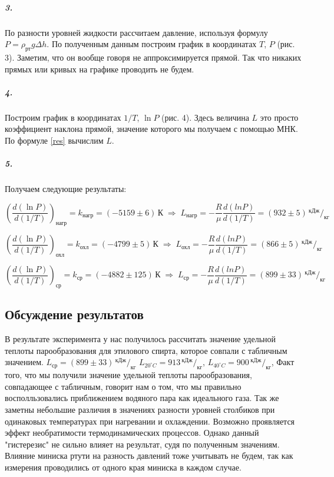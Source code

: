\documentclass[a4paper, 12pt]{article}
\begin{document}
\subparagraph*{3.}  По разности уровней жидкости рассчитаем давление, используя формулу $P = \rho_{рт} g \Delta h$. По полученным данным построим график в координатах $T$,  $P$ (рис. 3). Заметим, что он вообще говоря не аппроксимируется прямой. Так что никаких прямых или кривых на графике проводить не будем. 

\subparagraph*{4.} Построим график в координатах $1/T$,  $\ln P$ (рис. 4). Здесь величина $L$ это просто коэффициент наклона прямой, значение которого мы получаем с помощью МНК. По формуле \eqref{res} вычислим $L$.

\subparagraph*{5.} Получаем следующие результаты:

\[\left(\dfrac{d(\ln P)}{d(1/T)}\right)_{\text{нагр}} = k_{\text{нагр}} = (-5159 \pm 6)\, \text{К}  \; \Rightarrow \; L_{\text{нагр}} = -\dfrac{R}{\mu} \dfrac{d(ln P)}{d(1/T)} = (932 \pm 5)\, ^{\text{кДж}}/_{\text{кг}}\]
	
\[\left(\dfrac{d(\ln P)}{d(1/T)}\right)_{\text{охл}} = k_{\text{охл}} = (-4799 \pm  5)\, \text{К} \; \Rightarrow \; L_{\text{охл}} = -\dfrac{R}{\mu} \dfrac{d(ln P)}{d(1/T)} = (866 \pm 5)\, ^{\text{кДж}}/_{\text{кг}}\]
	
\[\left(\dfrac{d(\ln P)}{d(1/T)}\right)_{\text{ср}} =k_{\text{ср}} = (-4882 \pm  125)\, \text{К} \; \Rightarrow \; L_{\text{ср}} = -\dfrac{R}{\mu} \dfrac{d(ln P)}{d(1/T)} = (899 \pm 33)\, ^{\text{кДж}}/_{\text{кг}}\]


\begin{center}
	\subsection*{Обсуждение результатов}
\end{center}
	
В результате эксперимента у нас получилось рассчитать значение удельной теплоты парообразования для этилового спирта, которое совпали с табличным значением. $L_{\text{ср}} = (899 \pm 33)\, ^{\text{кДж}}/_{\text{кг}}$ $L_{20 ^\circ C} = 913\, ^{\text{кДж}}/_{\text{кг}}$, $L_{40 ^\circ C} = 900\, ^{\text{кДж}}/_{\text{кг}}$, Факт того, что мы получили значение удельной теплоты парообразования, совпадающее с табличным, говорит нам о том, что мы правильно восполльзовались приближением водяного пара как идеального газа. Так же заметны небольшие различия в значениях разности уровней столбиков при одинаковых температурах при нагревании и охлаждении. Возможно проявляется эффект необратимости термодинамических процессов. Однако данный "гистерезис" не сильно влияет на результат, судя по полученным значениям. 
Влияние миниска ртути на разность давлений тоже учитывать не будем, так как измерения проводились от одного края миниска в каждом случае.
\end{document}
